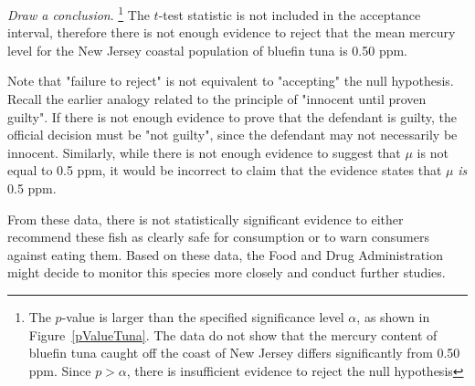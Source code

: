 \begin{examplewrap}
\begin{nexample}

\textit{Draw a conclusion}. \footnote{The $p$-value is larger than the specified significance level $\alpha$, as shown in Figure~\ref{pValueTuna}. The data do not show that the mercury content of bluefin tuna caught off the coast of New Jersey differs significantly from 0.50 ppm. Since $p > \alpha$, there is insufficient evidence to reject the null hypothesis} The $t$-test statistic is not included in the acceptance interval, therefore there is not enough evidence to reject  that the mean mercury level for the New Jersey coastal population of bluefin tuna is 0.50 ppm. 

Note that "failure to reject" is not equivalent to "accepting" the null hypothesis. Recall the earlier analogy related to the principle of "innocent until proven guilty". If there is not enough evidence to prove that the defendant is guilty, the official decision must be "not guilty", since the defendant may not necessarily be innocent. Similarly, while there is not enough evidence to suggest that $\mu$ is not equal to 0.5 ppm, it would be incorrect to claim that the evidence states that $\mu$ \textit{is} 0.5 ppm.

From these data, there is not statistically significant evidence to either recommend these fish as clearly safe for consumption or to warn consumers against eating them. Based on these data, the Food and Drug Administration might decide to monitor this species more closely and conduct further studies. 
\end{nexample}
\end{examplewrap}

